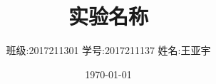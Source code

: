 \documentclass[CJK, GBK, UTF-8, oneside, a4paper, 12pt]{ctexart}
\title{\textbf{实验名称}}
\author{班级:2017211301 学号:2017211137 姓名:王亚宇}
\date{\today}
\begin{document}
\allowdisplaybreaks
\maketitle
\tableofcontents
% 

% 
% 
% 
% 
% 

\end{document}

